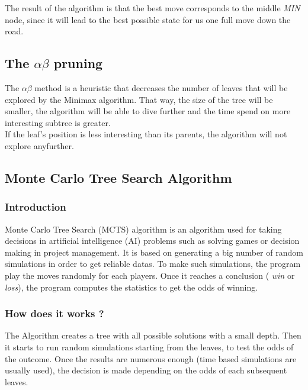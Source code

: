 The result of the algorithm is that the best move corresponds to the middle  \textit{MIN} node, since it will lead to the best possible state for us one full move down the road.

\subsection{The \ensuremath{\alpha\beta} pruning} %
The \ensuremath{\alpha\beta} method is a heuristic that decreases the number of leaves that will be explored by the Minimax algorithm. That way, the size of the tree will be smaller, the algorithm will be able to dive further and the time spend on more interesting subtree is greater.\\
If the leaf's position is less interesting than its parents, the algorithm will not explore anyfurther.

\subsection{Monte Carlo Tree Search Algorithm}
\subsubsection{Introduction}
Monte Carlo Tree Search (MCTS) algorithm is an algorithm used for taking decisions in artificial intelligence (AI) problems such as solving games or decision making in project management. It is based on generating a big number of random simulations in order to get reliable datas. To make such simulations, the program play the moves randomly for each players. Once it reaches a conclusion ( \textit{win} or  \textit{loss}), the program computes the statistics to get the odds of winning.
\subsubsection{How does it works ?}
The Algorithm creates a tree with all possible solutions with a small depth.
Then it starts to run random simulations starting from the leaves, to test the odds of the outcome.
Once the results are numerous enough (time based simulations are usually used), the decision is made depending on the odds of each subsequent leaves.
